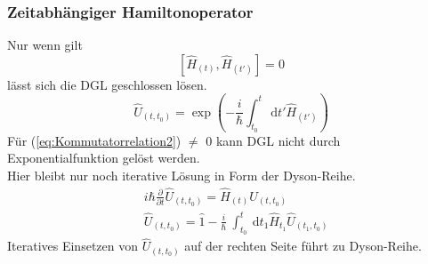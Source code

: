 \documentclass[10pt,article,colorback,accentcolor=tud9d]{scrartcl}
\begin{document}
\subsubsection{Zeitabhängiger Hamiltonoperator}
Nur wenn gilt 
\begin{equation}
\left[\hat{H}_{(t)},\hat{H}_{(t')}\right]=0
\label{eq:Kommutatorrelation2}
\end{equation}
lässt sich die DGL geschlossen lösen.
\begin{equation}
\hat{U}_{(t,t_0)}=\exp\left(-\frac{i}{\hbar}\int_{t_0}^t \ \text{d}t'\hat{H}_{(t')}\right)
\end{equation}
Für (\ref{eq:Kommutatorrelation2}) $\neq$ 0 kann DGL nicht durch Exponentialfunktion gelöst werden.\\
Hier bleibt nur noch iterative Lösung in Form der Dyson-Reihe.
\begin{align}
&i\hbar\frac{\partial}{\partial t} \hat{U}_{(t,t_0)}=\hat{H}_{(t)}\hat{U}_{(t,t_0)}\\
&\hat{U}_{(t,t_0)}=\hat{1}-\frac{i}{\hbar} \ \int^t_{t_0}\ \text{d}t_1\hat{H}_{t_1}\hat{U}_{(t_1,t_0)}
\end{align}
Iteratives Einsetzen von $\hat{U}_{(t,t_0)}$ auf der rechten Seite führt zu Dyson-Reihe.
\end{document}
